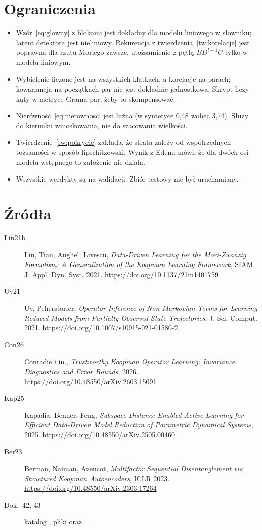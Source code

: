 \documentclass[11pt,a4paper]{article}
\theoremstyle{definition}
\theoremstyle{remark}
\begin{document}
\section{Ograniczenia}

\begin{itemize}
\item Wzór~\eqref{eq:glowny} z blokami jest dokładny dla modelu liniowego w słowniku; latent detektora
jest nieliniowy. Rekurencja z twierdzenia~\ref{tw:korelacje} jest poprawna dla rzutu Moriego zawsze,
utożsamienie z pętlą $BD^{l-1}C$ tylko w modelu liniowym.
\item Wybielenie liczone jest na wszystkich klatkach, a korelacje na parach; kowariancja na początkach
par nie jest dokładnie jednostkowa. Skrypt liczy kąty w metryce Grama par, żeby to skompensować.
\item Nierówność~\eqref{eq:nierownosc} jest luźna (w syntetyce 0,48 wobec 3,74). Służy do kierunku
wnioskowania, nie do szacowania wielkości.
\item Twierdzenie~\ref{tw:pokrycie} zakłada, że strata zależy od współrzędnych tożsamości w sposób
lipschitzowski. Wynik z Edenu mówi, że dla dwóch osi modelu wstępnego to założenie nie działa.
\item Wszystkie werdykty są na walidacji. Zbiór testowy nie był uruchamiany.
\end{itemize}

\section*{Źródła}
\small
\begin{description}
\item[Lin21b] Lin, Tian, Anghel, Livescu, \emph{Data-Driven Learning for the Mori-Zwanzig Formalism:
A Generalization of the Koopman Learning Framework}, SIAM J. Appl. Dyn. Syst. 2021.
\url{https://doi.org/10.1137/21m1401759}
\item[Uy21] Uy, Peherstorfer, \emph{Operator Inference of Non-Markovian Terms for Learning Reduced Models
from Partially Observed State Trajectories}, J. Sci. Comput. 2021. \url{https://doi.org/10.1007/s10915-021-01580-2}
\item[Con26] Conradie i in., \emph{Trustworthy Koopman Operator Learning: Invariance Diagnostics and Error
Bounds}, 2026. \url{https://doi.org/10.48550/arXiv.2603.15091}
\item[Kap25] Kapadia, Benner, Feng, \emph{Subspace-Distance-Enabled Active Learning for Efficient Data-Driven
Model Reduction of Parametric Dynamical Systems}, 2025. \url{https://doi.org/10.48550/arXiv.2505.00460}
\item[Ber23] Berman, Naiman, Azencot, \emph{Multifactor Sequential Disentanglement via Structured Koopman
Autoencoders}, ICLR 2023. \url{https://doi.org/10.48550/arXiv.2303.17264}
\item[Dok.~42, 43] katalog , pliki
 oraz
.
\end{description}
\end{document}
